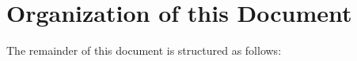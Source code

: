 %
%
%
%
%
%
%
%
%
%
%
%
%

\section{Organization of this Document}
\label{sec:Organization of this document}
The remainder of this document is structured as follows:

